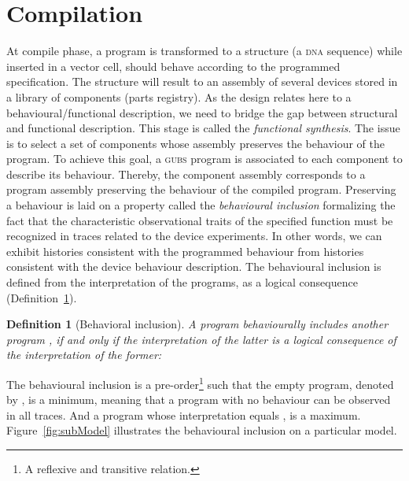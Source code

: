 \documentclass{eptcs}
\newtheorem{definition}{Definition}
\newcommand{\eg}[0]{\abbrev{\textit{e.g.}}}
\newcounter{ti}
\begin{document}
\section{Compilation}
\label{sec:compil}
At compile phase, a program is transformed to a structure (\eg a \textsc{dna} sequence) while inserted in a vector cell, should behave according to the programmed specification. The structure will result to an assembly of several devices stored in a library of components (\eg parts registry). As the design relates here to a behavioural/functional description, we need to bridge the gap between structural and functional description. This stage is called the \emph{functional synthesis}. The issue is to select a set of components whose assembly preserves the behaviour of the program. To achieve this goal, a \textsc{gubs} program is associated to each component to describe its behaviour. Thereby, the component assembly corresponds to a program assembly preserving the behaviour of the compiled program.
Preserving a behaviour is laid on a property called the \emph{behavioural inclusion} formalizing the fact that the characteristic observational traits of the specified function must be recognized in traces related to the device experiments. In other words, we can exhibit histories consistent with the programmed behaviour from histories consistent with the device behaviour description. 
The behavioural inclusion is defined from the interpretation of the programs, as a logical consequence (Definition~\ref{def:behinc}). 
\begin{definition}[Behavioral inclusion]
\label{def:behinc}
A program  \emph{behaviourally includes} another program , if and only if the interpretation of the latter is a logical consequence of the interpretation of the former:

\end{definition}
The behavioural inclusion is a pre-order\footnote{A reflexive and transitive relation.} such that the empty program, denoted by , is a minimum, meaning that a program with no behaviour can be observed in all traces. And a program whose interpretation equals , is a maximum. 
 Figure~\ref{fig:subModel} illustrates the behavioural inclusion on a particular model.
\end{document}
